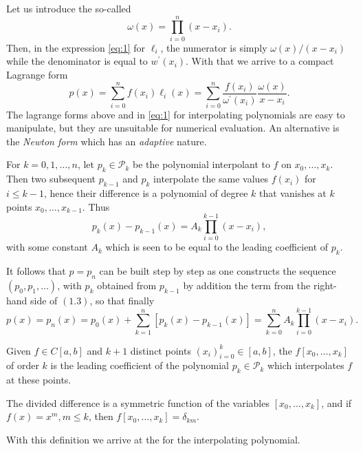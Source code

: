 \documentclass[a4paper]{scrartcl}
\begin{document}
Let us introduce the so-called 
$$
\omega(x)=\prod_{i=0}^{n}\left(x-x_{i}\right) .
$$
Then, in the expression \eqref{eq:1} for $\ell_{i}$, the numerator is simply $\omega(x) /\left(x-x_{i}\right)$ while the denominator is equal to $w^{\prime}\left(x_{i}\right)$. With that we arrive to a compact Lagrange form
$$
\boxed{
  p(x)=\sum_{i=0}^{n} f\left(x_{i}\right) \ell_{i}(x)=\sum_{i=0}^{n} \frac{f\left(x_{i}\right)}{\omega^{\prime}\left(x_{i}\right)} \frac{\omega(x)}{x-x_{i}}
}.
$$
The lagrange forms above and in \eqref{eq:1} for interpolating polynomials are easy to manipulate, but they are unsuitable for numerical evaluation. An alternative is the \emph{Newton form} which has an \emph{adaptive} nature.

\begin{method}
For $k=0,1, \ldots, n$, let $p_{k} \in \mathcal{P}_{k}$ be the polynomial interpolant to $f$ on $x_{0}, \ldots, x_{k}$. Then two subsequent $p_{k-1}$ and $p_{k}$ interpolate the same values $f\left(x_{i}\right)$ for $i \leq k-1$, hence their difference is a polynomial of degree $k$ that vanishes at $k$ points $x_{0}, \ldots, x_{k-1}$. Thus
$$
p_{k}(x)-p_{k-1}(x)=A_{k} \prod_{i=0}^{k-1}\left(x-x_{i}\right),
$$
with some constant $A_{k}$ which is seen to be equal to the leading coefficient of $p_{k}$. 

It follows that $p=p_{n}$ can be built step by step as one constructs the sequence $\left(p_{0}, p_{1}, \ldots\right)$, with $p_{k}$ obtained from $p_{k-1}$ by addition the term from the right-hand side of $(1.3)$, so that finally
$$
p(x)=p_{n}(x)=p_{0}(x)+\sum_{k=1}^{n}\left[p_{k}(x)-p_{k-1}(x)\right]=\sum_{k=0}^{n} A_{k} \prod_{i=0}^{k-1}\left(x-x_{i}\right).
$$
\end{method}

\begin{definition}
Given $f \in C[a, b]$ and $k+1$ distinct points $\left(x_{i}\right)_{i=0}^{k} \in[a, b]$, the  $f\left[x_{0}, \ldots, x_{k}\right]$ of order $k$ is the leading coefficient of the polynomial $p_{k} \in \mathcal{P}_{k}$ which interpolates $f$ at these points. 
\end{definition}

The divided difference is a symmetric function of the variables $\left[x_{0}, \ldots, x_{k}\right]$, and if $f(x)=x^{m}, m \leq k$, then $f\left[x_{0}, \ldots, x_{k}\right]=\delta_{k m}$.

With this definition we arrive at the  for the interpolating polynomial.
\end{document}
